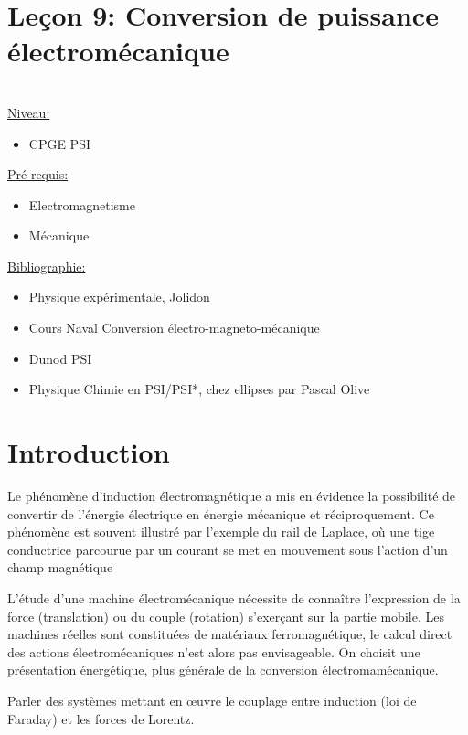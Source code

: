 \documentclass[french, a4paper, 10pt, twocolumn, landscape]{article}
\begin{document}
\section*{Leçon 9: Conversion de puissance électromécanique}

\hrulefill\\
	\underline{Niveau:}
	\begin{itemize}
		\item CPGE PSI
	\end{itemize}
	\underline{Pré-requis:} 
	\begin{itemize}
        \item Electromagnetisme
		\item Mécanique
	\end{itemize}
	\uline{Bibliographie:}
	\begin{itemize}
		\item Physique expérimentale, Jolidon
		\item Cours Naval Conversion électro-magneto-mécanique
		\item Dunod PSI
		\item Physique Chimie en PSI/PSI*, chez ellipses par Pascal Olive
	\end{itemize}
\hrulefill

\section*{Introduction}
Le phénomène d’induction électromagnétique a mis en évidence la possibilité
de convertir de l’énergie électrique en énergie mécanique et réciproquement. Ce phénomène est souvent illustré par l'exemple du rail de Laplace, où une tige conductrice parcourue par un courant se met en mouvement sous l'action d'un champ magnétique\medskip

L’étude d’une machine électromécanique nécessite de connaître l’expression de
la force (translation) ou du couple (rotation) s’exerçant sur la partie mobile. Les
machines réelles sont constituées de matériaux ferromagnétique, le calcul direct des
actions électromécaniques n’est alors pas envisageable. On choisit une présentation énergétique, plus générale de la conversion électromamécanique.\medskip

Parler des systèmes mettant en \oe uvre le couplage entre induction (loi de Faraday) et les forces de Lorentz. \medskip
\end{document}
